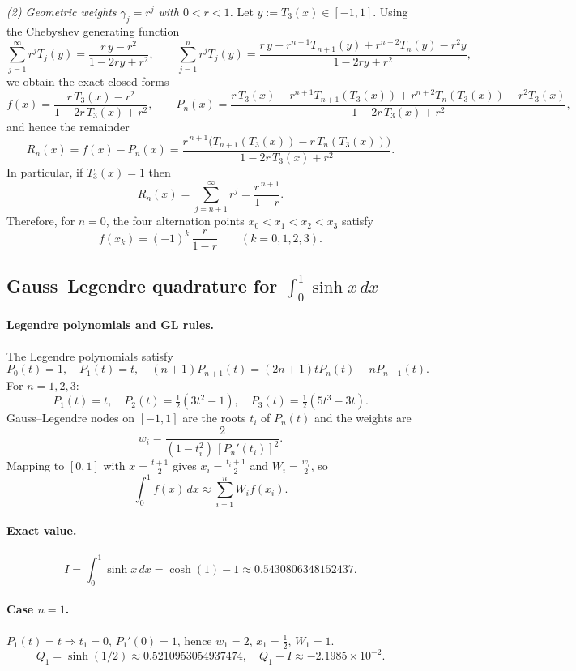 \documentclass[12pt,a4paper]{article}
\theoremstyle{plain}
\theoremstyle{definition}
\theoremstyle{remark}
\theoremstyle{remark}
\begin{document}
\emph{(2) Geometric weights $\gamma_j=r^j$ with $0<r<1$.}
Let $y:=T_3(x)\in[-1,1]$.
Using the Chebyshev generating function
\[
\sum_{j=1}^{\infty} r^{j}T_j(y)=\frac{r\,y-r^2}{1-2ry+r^2},
\qquad
\sum_{j=1}^{n} r^{j}T_j(y)
=\frac{r\,y - r^{n+1}T_{n+1}(y) + r^{n+2}T_n(y) - r^2 y}{1-2ry+r^2},
\]
we obtain the exact closed forms
\[
f(x)=\frac{r\,T_3(x)-r^2}{1-2r\,T_3(x)+r^2},\qquad
P_n(x)=\frac{r\,T_3(x) - r^{n+1}T_{n+1}(T_3(x))
	+ r^{n+2}T_n(T_3(x)) - r^2 T_3(x)}{1-2r\,T_3(x)+r^2},
\]
and hence the remainder
\[
R_n(x)=f(x)-P_n(x)
=\frac{r^{\,n+1}\big(T_{n+1}(T_3(x)) - r\,T_n(T_3(x))\big)}{1-2r\,T_3(x)+r^2}.
\]
In particular, if $T_3(x)=1$ then
\[
R_n(x)=\sum_{j=n+1}^{\infty} r^{j}=\frac{r^{\,n+1}}{1-r}.
\]
Therefore, for $n=0$, the four alternation points $x_0<x_1<x_2<x_3$ satisfy
\[
f(x_k)=(-1)^k\,\frac{r}{1-r}\qquad (k=0,1,2,3).
\]

	
	
	
\subsection*{Gauss--Legendre quadrature for $\displaystyle \int_0^1 \sinh x\,dx$}

\paragraph{Legendre polynomials and GL rules.}
The Legendre polynomials satisfy
\[
P_0(t)=1,\quad P_1(t)=t,\quad (n+1)P_{n+1}(t)=(2n+1)tP_n(t)-nP_{n-1}(t).
\]
For $n=1,2,3$:
\[
P_1(t)=t,\quad P_2(t)=\tfrac12(3t^2-1),\quad P_3(t)=\tfrac12(5t^3-3t).
\]
Gauss--Legendre nodes on $[-1,1]$ are the roots $t_i$ of $P_n(t)$ and the weights are
\[
w_i=\frac{2}{(1-t_i^2)\,[P_n'(t_i)]^2}.
\]
Mapping to $[0,1]$ with $x=\frac{t+1}{2}$ gives $x_i=\frac{t_i+1}{2}$ and $W_i=\frac{w_i}{2}$, so
\[
\int_0^1 f(x)\,dx \approx \sum_{i=1}^n W_i f(x_i).
\]

\paragraph{Exact value.}
\[
I=\int_0^1 \sinh x\,dx=\cosh(1)-1\approx 0.5430806348152437.
\]

\paragraph{Case $n=1$.}
$P_1(t)=t\Rightarrow t_1=0$, $P_1'(0)=1$, hence
$w_1=2$, $x_1=\tfrac12$, $W_1=1$.
\[
Q_1=\sinh(1/2)\approx 0.5210953054937474,\quad Q_1-I\approx -2.1985\times 10^{-2}.
\]
\end{document}
